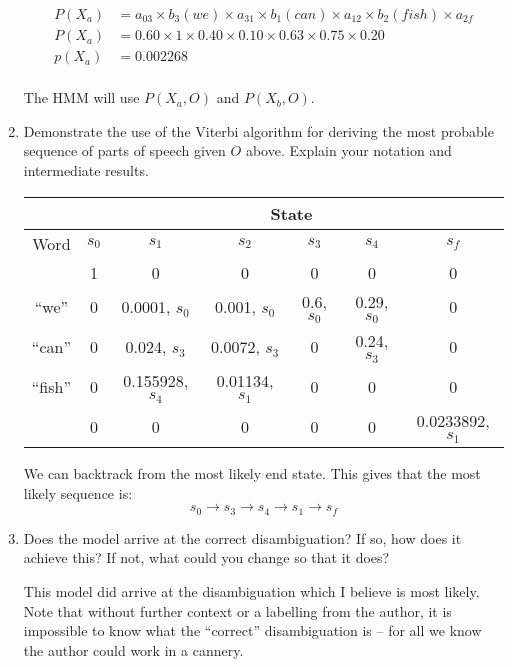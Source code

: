 \documentclass[10pt,\jkfside,a4paper]{article}
\begin{document}
\begin{enumerate}
\begin{equation}
\begin{split}
P(X_a) &= a_{03} \times b_3(we) \times a_{31} \times b_1(can) \times a_{12} \times b_2(fish) \times a_{2f} \\
P(X_a) &= 0.60 \times 1 \times 0.40 \times 0.10 \times 0.63 \times 0.75 \times 0.20 \\
p(X_a) &= 0.002268 \\
\end{split}
\end{equation}

The HMM will use $P(X_a, O)$ and $P(X_b, O)$.

\item Demonstrate the use of the Viterbi algorithm for deriving the most probable
sequence of parts of speech given $O$ above. Explain your notation and
intermediate results.

\begin{center}
\begin{tabular}{|c|c c c c c c|}
 & \multicolumn{6}{c}{State} \\
\hline 
Word & $s_0$ & $s_1$ & $s_2$ & $s_3$ & $s_4$ & $s_f$ \\
 & 1 & 0 & 0 & 0 & 0 & 0 \\
``we'' & 0 & 0.0001, $s_0$ & 0.001, $s_0$ & 0.6, $s_0$ & 0.29, $s_0$ & 0 \\
``can'' & 0 & 0.024, $s_3$ &  0.0072, $s_3$ & 0 & 0.24, $s_3$ & 0 \\
``fish'' & 0 & 0.155928, $s_4$ & 0.01134, $s_1$ & 0 & 0 & 0 \\
 & 0 & 0 & 0 & 0 & 0 & 0.0233892, $s_1$ \\
\end{tabular}
\end{center}

We can backtrack from the most likely end state. This gives that the most likely 
sequence is:
\[s_0 \longrightarrow s_3 \longrightarrow s_4 \longrightarrow s_1 \longrightarrow s_f\]

\item Does the model arrive at the correct disambiguation? If so, how does it
achieve this? If not, what could you change so that it does?

This model did arrive at the disambiguation which I believe is most likely. Note that 
without further context or a labelling from the author, it is impossible to know what 
the ``correct'' disambiguation is -- for all we know the author could work in a cannery.


\end{enumerate}
\end{document}
